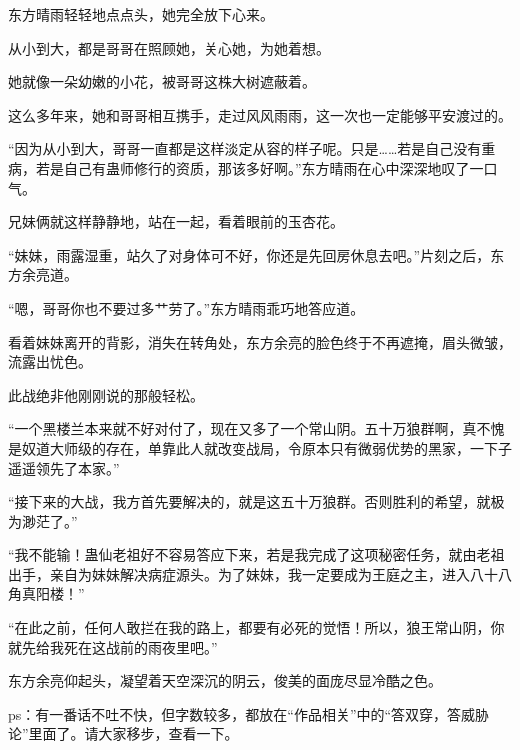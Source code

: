 \begin{this_body}
东方晴雨轻轻地点点头，她完全放下心来。

从小到大，都是哥哥在照顾她，关心她，为她着想。

她就像一朵幼嫩的小花，被哥哥这株大树遮蔽着。

这么多年来，她和哥哥相互携手，走过风风雨雨，这一次也一定能够平安渡过的。

“因为从小到大，哥哥一直都是这样淡定从容的样子呢。只是……若是自己没有重病，若是自己有蛊师修行的资质，那该多好啊。”东方晴雨在心中深深地叹了一口气。

兄妹俩就这样静静地，站在一起，看着眼前的玉杏花。

“妹妹，雨露湿重，站久了对身体可不好，你还是先回房休息去吧。”片刻之后，东方余亮道。

“嗯，哥哥你也不要过多艹劳了。”东方晴雨乖巧地答应道。

看着妹妹离开的背影，消失在转角处，东方余亮的脸色终于不再遮掩，眉头微皱，流露出忧色。

此战绝非他刚刚说的那般轻松。

“一个黑楼兰本来就不好对付了，现在又多了一个常山阴。五十万狼群啊，真不愧是奴道大师级的存在，单靠此人就改变战局，令原本只有微弱优势的黑家，一下子遥遥领先了本家。”

“接下来的大战，我方首先要解决的，就是这五十万狼群。否则胜利的希望，就极为渺茫了。”

“我不能输！蛊仙老祖好不容易答应下来，若是我完成了这项秘密任务，就由老祖出手，亲自为妹妹解决病症源头。为了妹妹，我一定要成为王庭之主，进入八十八角真阳楼！”

“在此之前，任何人敢拦在我的路上，都要有必死的觉悟！所以，狼王常山阴，你就先给我死在这战前的雨夜里吧。”

东方余亮仰起头，凝望着天空深沉的阴云，俊美的面庞尽显冷酷之色。

ps：有一番话不吐不快，但字数较多，都放在“作品相关”中的“答双穿，答威胁论”里面了。请大家移步，查看一下。

\end{this_body}

